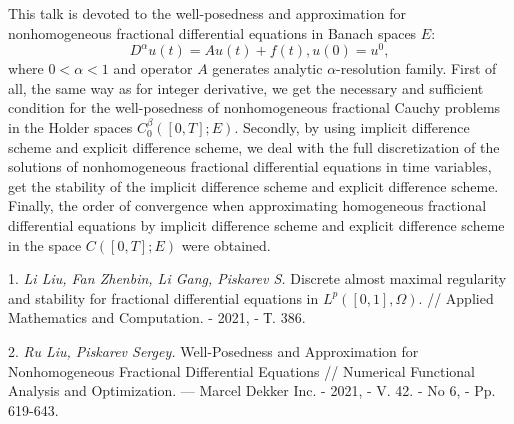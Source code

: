 




\vzmscaption



This talk is devoted to  the  well-posedness and approximation for nonhomogeneous
fractional differential equations in Banach spaces $E:$
$$ D^\alpha u(t) = A u(t) + f(t), u(0)= u^0, $$
where $0 < \alpha <1$ and operator $A$ generates analytic $\alpha$-resolution family.
 First of all, the same way
as for integer derivative, we get the necessary and sufficient condition for the
well-posedness of   nonhomogeneous fractional Cauchy problems in the Holder spaces
$C^\beta_0([0,T];E).$ Secondly, by using implicit difference scheme and
explicit  difference scheme, we deal with the full discretization of the solutions
of nonhomogeneous fractional differential equations in time variables, get the  stability
of the implicit difference scheme and
explicit difference scheme. Finally, the order of convergence when approximating
homogeneous fractional differential equations by implicit difference scheme and
explicit difference scheme in the space $C([0,T];E)$ were obtained.






1. {\it Li Liu, Fan Zhenbin, Li Gang, Piskarev S.} Discrete almost maximal regularity and stability for
fractional differential equations in $L^p ([0, 1], \Omega).$ //  Applied Mathematics and Computation. - 2021, - Т. 386.

2. {\it Ru Liu, Piskarev Sergey.} Well-Posedness and Approximation for Nonhomogeneous Fractional Differential Equations
// Numerical Functional Analysis and Optimization. --- Marcel Dekker Inc. - 2021, - V. 42. - No 6, - Pp. 619-643.



